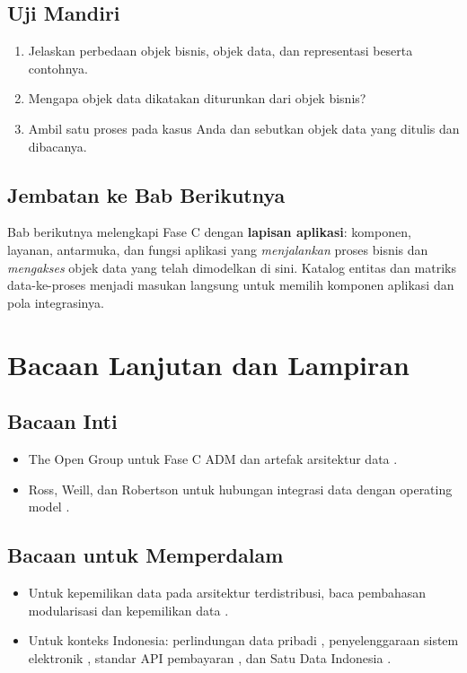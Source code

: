 \subsection*{Uji Mandiri}
\begin{enumerate}
  \item Jelaskan perbedaan objek bisnis, objek data, dan representasi beserta
        contohnya.
  \item Mengapa objek data dikatakan diturunkan dari objek bisnis?
  \item Ambil satu proses pada kasus Anda dan sebutkan objek data yang ditulis dan
        dibacanya.
\end{enumerate}

\subsection*{Jembatan ke Bab Berikutnya}
Bab berikutnya melengkapi Fase C dengan \textbf{lapisan aplikasi}: komponen,
layanan, antarmuka, dan fungsi aplikasi yang \emph{menjalankan} proses bisnis dan
\emph{mengakses} objek data yang telah dimodelkan di sini. Katalog entitas dan
matriks data-ke-proses menjadi masukan langsung untuk memilih komponen aplikasi
dan pola integrasinya.

\section{Bacaan Lanjutan dan Lampiran}

\subsection*{Bacaan Inti}
\begin{itemize}
  \item The Open Group untuk Fase C ADM dan artefak arsitektur data \cite{togaf10}.
  \item Ross, Weill, dan Robertson untuk hubungan integrasi data dengan operating
        model \cite{ross2006enterprise}.
\end{itemize}

\subsection*{Bacaan untuk Memperdalam}
\begin{itemize}
  \item Untuk kepemilikan data pada arsitektur terdistribusi, baca pembahasan
        modularisasi dan kepemilikan data \cite{newman2021building}.
  \item Untuk konteks Indonesia: perlindungan data pribadi \cite{uupdp2022},
        penyelenggaraan sistem elektronik \cite{pp712019}, standar API pembayaran
        \cite{snapbi}, dan Satu Data Indonesia \cite{satudata}.
\end{itemize}

